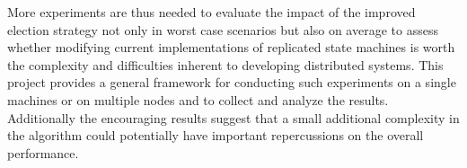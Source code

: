 \documentclass[a4paper, 10pt]{article}
\begin{document}
More experiments are thus needed to evaluate the impact of the improved election strategy not only in worst case scenarios but also on average to assess whether modifying current implementations of replicated state machines is worth the complexity and difficulties inherent to developing distributed systems. This project provides a general framework for conducting such experiments on a single machines or on multiple nodes and to collect and analyze the results. Additionally the encouraging results suggest that a small additional complexity in the algorithm could potentially have important repercussions on the overall performance.

{}

\end{document}
